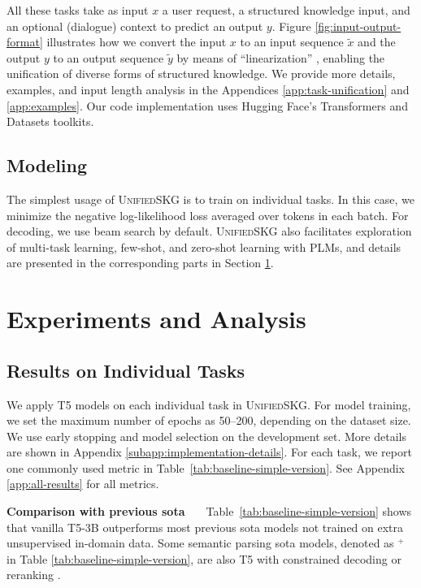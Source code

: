 All these tasks take as input $x$ a user request, a structured knowledge input, and an optional (dialogue) context to predict an output $y$. Figure \ref{fig:input-output-format} illustrates how we convert the input $x$ to an input sequence $\tilde{x}$ and the output $y$ to an output sequence $\tilde{y}$ by means of ``linearization'' \cite{liu2021tapex}, enabling the unification of diverse forms of structured knowledge. We provide more details, examples, and input length analysis in the Appendices \ref{app:task-unification} and \ref{app:examples}.
Our code implementation uses Hugging Face's Transformers \cite{wolf-etal-2020-transformers} and Datasets \cite{lhoest2021datasets} toolkits. 

\subsection{Modeling}
The simplest usage of \textsc{Unified}SKG is to train on individual tasks. In this case, we minimize the negative log-likelihood loss averaged over tokens in each batch. For decoding, we use beam search by default.
\textsc{Unified}SKG also facilitates exploration of multi-task learning, few-shot, and zero-shot learning with PLMs, and details are presented in the corresponding parts in Section \ref{sec:results}. 

\section{Experiments and Analysis}
\label{sec:results}

\subsection{Results on Individual Tasks} 
\label{subsec:baseline-performance}
We apply T5 models \cite{2020t5} on each individual task in \textsc{Unified}SKG.
For model training, we set the maximum number of epochs as 50--200, depending on the dataset size. We use early stopping and model selection on the development set. More details are shown in Appendix \ref{subapp:implementation-details}. 
For each task, we report one commonly used metric in Table~\ref{tab:baseline-simple-version}. See Appendix \ref{app:all-results} for all metrics. 

\textbf{Comparison with previous sota \ \ }
Table~\ref{tab:baseline-simple-version} shows that vanilla T5-3B outperforms most previous sota models not trained on extra unsupervised in-domain data. Some semantic parsing sota models, denoted as $^{+}$ in Table \ref{tab:baseline-simple-version}, are also T5 with constrained decoding \cite{Scholak2021:PICARD} or reranking \cite{ye2021rng}. 

